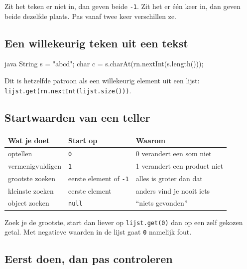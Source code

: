 \documentclass[a4paper,11pt]{article}
\begin{document}
Zit het teken er niet in, dan geven beide \texttt{-1}. Zit het er \'e\'en keer
in, dan geven beide dezelfde plaats. Pas vanaf twee keer verschillen ze.

\subsection{Een willekeurig teken uit een tekst}

\begin{codeblock}{java}
    String s = "abcd";
    char c = s.charAt(rn.nextInt(s.length()));
\end{codeblock}

Dit is hetzelfde patroon als een willekeurig element uit een lijst:
\texttt{lijst.get(rn.nextInt(lijst.size()))}.

\subsection{Startwaarden van een teller}

\begin{center}
    \begin{tabular}{@{}lll@{}}
        \toprule
        \textbf{Wat je doet} & \textbf{Start op}             & \textbf{Waarom}              \\
        \midrule
        optellen             & \texttt{0}                    & 0 verandert een som niet     \\
        vermenigvuldigen     & \texttt{1}                    & 1 verandert een product niet \\
        grootste zoeken      & eerste element of \texttt{-1} & alles is groter dan dat      \\
        kleinste zoeken      & eerste element                & anders vind je nooit iets    \\
        object zoeken        & \texttt{null}                 & ``niets gevonden''           \\
        \bottomrule
    \end{tabular}
\end{center}

Zoek je de grootste, start dan liever op \texttt{lijst.get(0)} dan op een zelf
gekozen getal. Met negatieve waarden in de lijst gaat \texttt{0} namelijk fout.

\subsection{Eerst doen, dan pas controleren}
\end{document}
